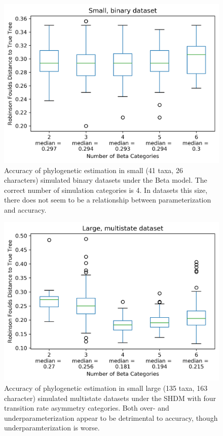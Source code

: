 \documentclass[]{article}
\begin{document}
\begin{figure}
  \caption{Accuracy of phylogenetic estimation in small (41 taxa, 26 characters) simulated binary datasets under the Beta model. The correct number of simulation categories is 4. In datasets this size, there does not seem to be a relationship between parameterization and accuracy. } 
    \includegraphics{fig/SmallBinary}
\end{figure} 


\begin{figure}
  \caption{Accuracy of phylogenetic estimation in small large (135 taxa, 163 character) simulated multistate datasets under the SHDM with four transition rate asymmetry categories. Both over- and underparameterization appear to be detrimental to accuracy, though underparamterization is worse.} 
    \includegraphics{fig/LargeMultiState}
\end{figure} 
\end{document}
